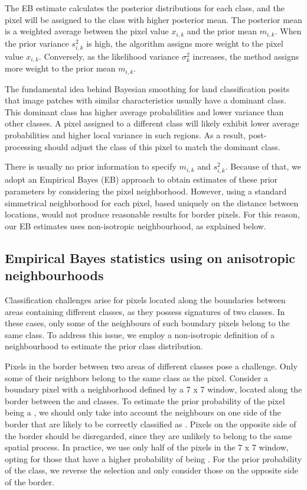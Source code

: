 \documentclass[
  shortnames]{jss}
\begin{document}
The EB estimate calculates the posterior distributions for each class, and the pixel will be assigned to the class with higher posterior mean. The posterior mean is a weighted average between the pixel value \(x_{i,k}\) and the prior mean \(m_{i,k}\). When the prior variance \(s^2_{i,k}\) is high, the algorithm assigns more weight to the pixel value \(x_{i,k}\). Conversely, as the likelihood variance \(\sigma^2_k\) increases, the method assigns more weight to the prior mean \(m_{i,k}\).

The fundamental idea behind Bayesian smoothing for land classification posits that image patches with similar characteristics usually have a dominant class. This dominant class has higher average probabilities and lower variance than other classes. A pixel assigned to a different class will likely exhibit lower average probabilities and higher local variance in such regions. As a result, post-processing should adjust the class of this pixel to match the dominant class.

There is usually no prior information to specify \(m_{i,k}\) and \(s^2_{i,k}\). Because of that, we adopt an Empirical Bayes (EB) approach to obtain estimates of these prior parameters by considering the pixel neighborhood. However, using a standard simmetrical neighborhood for each pixel, based uniquely on the distance between locations, would not produce reasonable results for border pixels. For this reason, our EB estimates uses non-isotropic neighbourhood, as explained below.

\hypertarget{empirical-bayes-statistics-using-on-anisotropic-neighbourhoods}{%
\subsection{Empirical Bayes statistics using on anisotropic neighbourhoods}\label{empirical-bayes-statistics-using-on-anisotropic-neighbourhoods}}

Classification challenges arise for pixels located along the boundaries between areas containing different classes, as they possess signatures of two classes. In these cases, only some of the neighbours of such boundary pixels belong to the same class. To address this issue, we employ a non-isotropic definition of a neighbourhood to estimate the prior class distribution.

Pixels in the border between two areas of different classes pose a challenge. Only some of their neighbors belong to the same class as the pixel. Consider a boundary pixel with a neighborhood defined by a 7 x 7 window, located along the border between the  and  classes. To estimate the prior probability of the pixel being a , we should only take into account the neighbours on one side of the border that are likely to be correctly classified as . Pixels on the opposite side of the border should be disregarded, since they are unlikely to belong to the same spatial process. In practice, we use only half of the pixels in the 7 x 7 window, opting for those that have a higher probability of being . For the prior probability of the  class, we reverse the selection and only consider those on the opposite side of the border.
\end{document}
